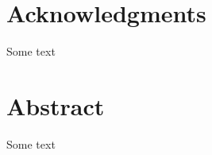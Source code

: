 \documentclass[12pt]{report}
\begin{document}

\chapter*{Acknowledgments}
\setlength{\parindent}{2.6em}

Some text


\chapter*{Abstract}

Some text

\newpage


\renewcommand{\contentsname}{\vspace{-27pt} \begin{center} \normalsize \textbf{TABLE OF CONTENTS} \end{center} \vspace{-1.5cm}}
\renewcommand\thepage{\romannumeral\numexpr\value{page}\relax}
{}
\tableofcontents
\newpage


\renewcommand{\listtablename}{\vspace{-80pt} \begin{center} \normalsize \textbf{LIST OF TABLES} \end{center} \vspace{-1.5cm}}
\listoftables
{}
\newpage


\renewcommand{\listfigurename}{\vspace{-77pt} \begin{center} \normalsize \textbf{LIST OF FIGURES} \end{center} \vspace{-1.5cm}}
\listoffigures
{}
\end{document}
